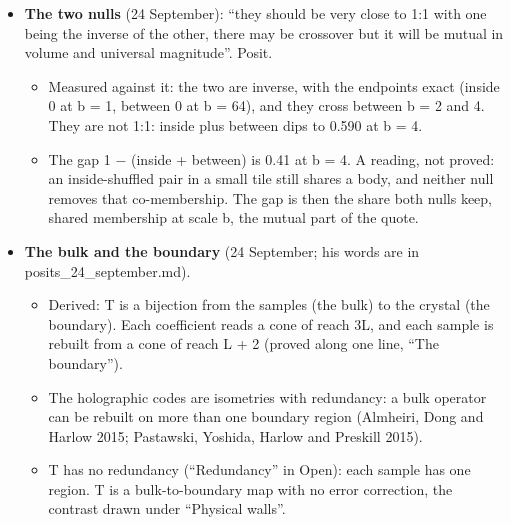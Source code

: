 \begin{itemize}
\begin{itemize}
\item Derived: E is a sum over edges, and a departure is linear in E and in the draws' sums. The departure of a whole is the sum of its edges' departures, exactly: the integral of its constituents, with the edge as the constituent. The whole equals its tiles plus its seams at every tile size (proved).
\item Built: each body's curve over its box, the six bounds xmax, xmin, ymax, ymin, zmax and zmin.
\end{itemize}
\item \textbf{The two nulls} (24 September): “they should be very close to 1:1 with one being the inverse of the other, there may be crossover but it will be mutual in volume and universal magnitude”. Posit.

\begin{itemize}
\item Measured against it: the two are inverse, with the endpoints exact (inside 0 at b = 1, between 0 at b = 64), and they cross between b = 2 and 4. They are not 1:1: inside plus between dips to 0.590 at b = 4.
\item The gap 1 − (inside + between) is 0.41 at b = 4. A reading, not proved: an inside-shuffled pair in a small tile still shares a body, and neither null removes that co-membership. The gap is then the share both nulls keep, shared membership at scale b, the mutual part of the quote.
\end{itemize}
\item \textbf{The bulk and the boundary} (24 September; his words are in posits\_\allowbreak{}24\_\allowbreak{}september.md).

\begin{itemize}
\item Derived: T is a bijection from the samples (the bulk) to the crystal (the boundary). Each coefficient reads a cone of reach 3L, and each sample is rebuilt from a cone of reach L + 2 (proved along one line, “The boundary”).
\item The holographic codes are isometries with redundancy: a bulk operator can be rebuilt on more than one boundary region (Almheiri, Dong and Harlow 2015; Pastawski, Yoshida, Harlow and Preskill 2015).
\item T has no redundancy (“Redundancy” in Open): each sample has one region. T is a bulk-to-boundary map with no error correction, the contrast drawn under “Physical walls”.
\end{itemize}
\end{itemize}

